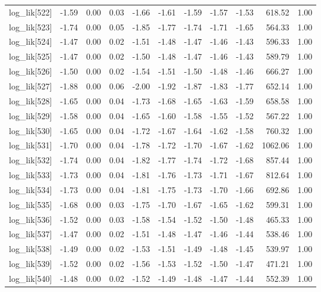 \begin{table}[ht]
\begin{tabular}{rrrrrrrrrrr}
  log\_lik[522] & -1.59 & 0.00 & 0.03 & -1.66 & -1.61 & -1.59 & -1.57 & -1.53 & 618.52 & 1.00 \\ 
  log\_lik[523] & -1.74 & 0.00 & 0.05 & -1.85 & -1.77 & -1.74 & -1.71 & -1.65 & 564.33 & 1.00 \\ 
  log\_lik[524] & -1.47 & 0.00 & 0.02 & -1.51 & -1.48 & -1.47 & -1.46 & -1.43 & 596.33 & 1.00 \\ 
  log\_lik[525] & -1.47 & 0.00 & 0.02 & -1.50 & -1.48 & -1.47 & -1.46 & -1.43 & 589.79 & 1.00 \\ 
  log\_lik[526] & -1.50 & 0.00 & 0.02 & -1.54 & -1.51 & -1.50 & -1.48 & -1.46 & 666.27 & 1.00 \\ 
  log\_lik[527] & -1.88 & 0.00 & 0.06 & -2.00 & -1.92 & -1.87 & -1.83 & -1.77 & 652.14 & 1.00 \\ 
  log\_lik[528] & -1.65 & 0.00 & 0.04 & -1.73 & -1.68 & -1.65 & -1.63 & -1.59 & 658.58 & 1.00 \\ 
  log\_lik[529] & -1.58 & 0.00 & 0.04 & -1.65 & -1.60 & -1.58 & -1.55 & -1.52 & 567.22 & 1.00 \\ 
  log\_lik[530] & -1.65 & 0.00 & 0.04 & -1.72 & -1.67 & -1.64 & -1.62 & -1.58 & 760.32 & 1.00 \\ 
  log\_lik[531] & -1.70 & 0.00 & 0.04 & -1.78 & -1.72 & -1.70 & -1.67 & -1.62 & 1062.06 & 1.00 \\ 
  log\_lik[532] & -1.74 & 0.00 & 0.04 & -1.82 & -1.77 & -1.74 & -1.72 & -1.68 & 857.44 & 1.00 \\ 
  log\_lik[533] & -1.73 & 0.00 & 0.04 & -1.81 & -1.76 & -1.73 & -1.71 & -1.67 & 812.64 & 1.00 \\ 
  log\_lik[534] & -1.73 & 0.00 & 0.04 & -1.81 & -1.75 & -1.73 & -1.70 & -1.66 & 692.86 & 1.00 \\ 
  log\_lik[535] & -1.68 & 0.00 & 0.03 & -1.75 & -1.70 & -1.67 & -1.65 & -1.62 & 599.31 & 1.00 \\ 
  log\_lik[536] & -1.52 & 0.00 & 0.03 & -1.58 & -1.54 & -1.52 & -1.50 & -1.48 & 465.33 & 1.00 \\ 
  log\_lik[537] & -1.47 & 0.00 & 0.02 & -1.51 & -1.48 & -1.47 & -1.46 & -1.44 & 538.46 & 1.00 \\ 
  log\_lik[538] & -1.49 & 0.00 & 0.02 & -1.53 & -1.51 & -1.49 & -1.48 & -1.45 & 539.97 & 1.00 \\ 
  log\_lik[539] & -1.52 & 0.00 & 0.02 & -1.56 & -1.53 & -1.52 & -1.50 & -1.47 & 471.21 & 1.00 \\ 
  log\_lik[540] & -1.48 & 0.00 & 0.02 & -1.52 & -1.49 & -1.48 & -1.47 & -1.44 & 552.39 & 1.00 \\ 

\end{tabular}
\end{table}
